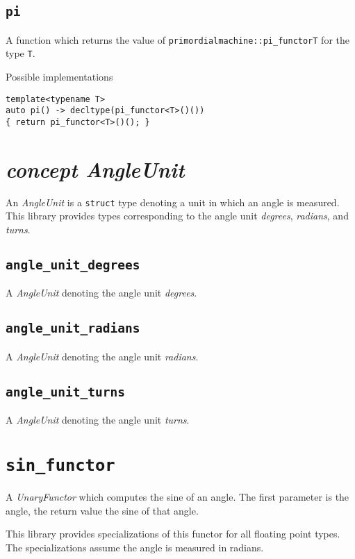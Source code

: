 \documentclass[oneside]{report}
\begin{document}
\subsection{\texttt{pi}}
A function which returns the value of \texttt{primordialmachine::pi\_functor\textlangle T\textrangle}
for the type \texttt{T}.

\noindent{}Possible implementations
\begin{verbatim}
template<typename T>
auto pi() -> decltype(pi_functor<T>()())
{ return pi_functor<T>()(); }
\end{verbatim}

\section{\textit{concept AngleUnit}}
An \textit{AngleUnit} is a \texttt{struct} type denoting a unit in which an angle is measured.
This library provides types corresponding to the angle unit \textit{degrees}, \textit{radians},
and \textit{turns}.

\subsection{\texttt{angle\_unit\_degrees}}
A \textit{AngleUnit} denoting the angle unit \textit{degrees}.
\subsection{\texttt{angle\_unit\_radians}}
A \textit{AngleUnit} denoting the angle unit \textit{radians}.
\subsection{\texttt{angle\_unit\_turns}}
A \textit{AngleUnit} denoting the angle unit \textit{turns}.

\section{\texttt{sin\_functor}}
A \textit{UnaryFunctor} which computes the
sine
of an angle.
The first parameter is the angle, the return value the sine of that angle.

\noindent{}This library provides specializations of this functor for all floating point types.
The specializations assume the angle is measured in radians.\\
\end{document}
